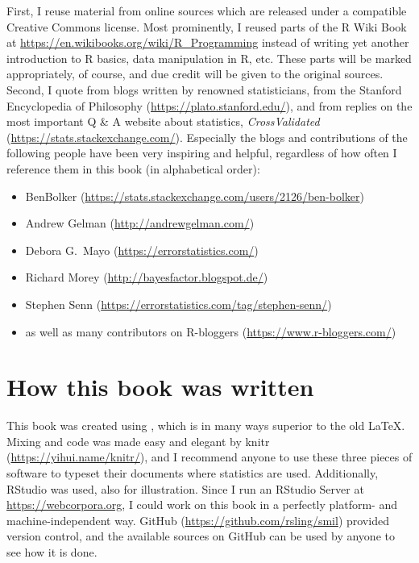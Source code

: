 First, I reuse material from online sources which are released under a compatible Creative Commons license.
Most prominently, I reused parts of the R Wiki Book at \url{https://en.wikibooks.org/wiki/R_Programming} instead of writing yet another introduction to R basics, data manipulation in R, etc.
These parts will be marked appropriately, of course, and due credit will be given to the original sources.
Second, I quote from blogs written by renowned statisticians, from the Stanford Encyclopedia of Philosophy (\url{https://plato.stanford.edu/}), and from replies on the most important Q \& A website about statistics, \textit{CrossValidated} (\url{https://stats.stackexchange.com/}).
Especially the blogs and contributions of the following people have been very inspiring and helpful, regardless of how often I reference them in this book (in alphabetical order):

\begin{itemize}
  \item BenBolker (\url{https://stats.stackexchange.com/users/2126/ben-bolker})
  \item Andrew Gelman (\url{http://andrewgelman.com/})
  \item Debora G.\ Mayo (\url{https://errorstatistics.com/})
  \item Richard Morey (\url{http://bayesfactor.blogspot.de/})
  \item Stephen Senn (\url{https://errorstatistics.com/tag/stephen-senn/})
  \item as well as many contributors on R-bloggers (\url{https://www.r-bloggers.com/})
\end{itemize}


\section{How this book was written}

This book was created using \XeLaTeX, which is in many ways superior to the old \LaTeX.
Mixing \XeLaTeX and  code was made easy and elegant by knitr (\url{https://yihui.name/knitr/}), and I recommend anyone to use these three pieces of software to typeset their documents where statistics are used.
Additionally, RStudio was used, also for illustration.
Since I run an RStudio Server at \url{https://webcorpora.org}, I could work on this book in a perfectly platform- and machine-independent way.
GitHub (\url{https://github.com/rsling/smil}) provided version control, and the available sources on GitHub can be used by anyone to see how it is done.
